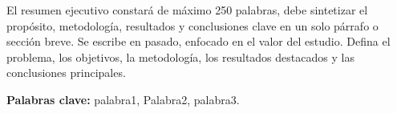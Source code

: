
El resumen ejecutivo constará de máximo 250 palabras, debe sintetizar el propósito,
metodología, resultados y conclusiones clave en un solo párrafo o sección breve. Se
escribe en pasado, enfocado en el valor del estudio. Defina el problema, los objetivos,
la metodología, los resultados destacados y las conclusiones principales.

\vspace{1em}
\noindent\textbf{Palabras clave:} palabra1, Palabra2, palabra3.

